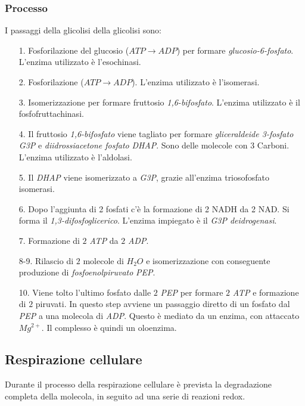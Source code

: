 			\subsubsection{Processo}
			I passaggi della glicolisi della glicolisi sono:
			\begin{multicols}{2}
				\begin{itemize}
					\item[1.] Fosforilazione del glucosio (\emph{$ATP\rightarrow ADP$}) per formare \emph{glucosio-6-fosfato}.
						L'enzima utilizzato \`e l'esochinasi.
					\item[2.] Fosforilazione (\emph{$ATP\rightarrow ADP$}). 
						L'enzima utilizzato \`e l'isomerasi.
					\item[3.] Isomerizzazione per formare fruttosio \emph{1,6-bifosfato}.
						L'enzima utilizzato \`e il fosfofruttachinasi.
					\item[4.] Il fruttosio \emph{1,6-bifosfato} viene tagliato per formare \emph{gliceraldeide 3-fosfato} \emph{G3P} e \emph{diidrossiacetone fosfato} \emph{DHAP}. 
						Sono delle molecole con $3$ Carboni. 
						L'enzima utilizzato \`e l'aldolasi.
					\item[5.] Il \emph{DHAP} viene isomerizzato a \emph{G3P}, grazie all'enzima triosofosfato isomerasi.
					\item[6.] Dopo l'aggiunta di 2 fosfati c'è la formazione di 2 NADH da 2 NAD\ap{+}. 
						Si forma il \emph{1,3-difosfoglicerico}.
						L'enzima impiegato \`e il \emph{G3P deidrogenasi}.
					\item[7.] Formazione di $2$ \emph{ATP} da $2$ \emph{ADP}.
					\item[8-9.] Rilascio di $2$ molecole di \emph{$H_2O$} e isomerizzazione con conseguente produzione di \emph{fosfoenolpiruvato} \emph{PEP}.
					\item[10.] Viene tolto l'ultimo fosfato dalle $2$ \emph{PEP} per formare $2$ \emph{ATP} e formazione di $2$ piruvati. 
						In questo step avviene un passaggio diretto di un fosfato dal \emph{PEP} a una molecola di \emph{ADP}. 
						Questo \`e mediato da un enzima, con attaccato \emph{$Mg^{2+}$}.
						Il complesso \`e quindi un oloenzima.
				\end{itemize}
			\end{multicols}

		\subsection{Respirazione cellulare}
		Durante il processo della respirazione cellulare \`e prevista la degradazione completa della molecola, in seguito ad una serie di reazioni redox. 
		
